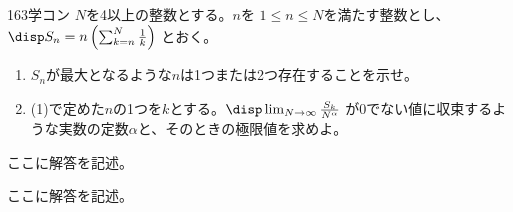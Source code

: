 \begin{prob}{163}{\maru}{学コン}
 $N$を4以上の整数とする。$n$を $1\le n \le N$を満たす整数とし、$\disp S_n=n\left(\sum_{k=n}^N \frac{1}{k}\right)$ とおく。
 \begin{enumerate}
  \item $S_n$が最大となるような$n$は1つまたは2つ存在することを示せ。
  \item (1)で定めた$n$の1つを$k$とする。$\disp \lim_{N\to\infty} \frac{S_k}{N^\alpha}$ が0でない値に収束するような実数の定数$\alpha$と、そのときの極限値を求めよ。
 \end{enumerate}
\end{prob}
ここに解答を記述。

ここに解答を記述。